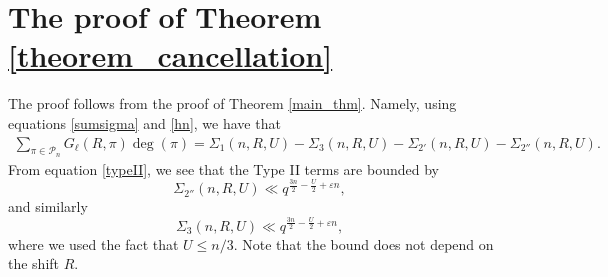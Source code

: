 \documentclass[12pt]{amsart}
\begin{document}
\section{The proof of Theorem \ref{theorem_cancellation}} \label{proof-thm-cancellation}
The proof follows from the proof of Theorem \ref{main_thm}. Namely, using equations \eqref{sumsigma} and \eqref{hn}, we have that
\begin{align*}
\sum_{\pi \in \mathcal{P}_n} G_{\ell}(R,\pi) \deg(\pi) =  \Sigma_1(n,R,U)-\Sigma_3(n,R,U)-\Sigma_{2'}(n,R,U)-\Sigma_{2''}(n,R,U).
\end{align*}
From equation \eqref{typeII}, we see that the Type II terms are bounded by 
\begin{equation}
\label{bdagain}
\Sigma_{2''}(n,R,U) \ll q^{\frac{3n}{2}-\frac{U}{2}+\varepsilon n } ,
\end{equation}
and similarly 
\begin{equation}
\label{bdagain2}
\Sigma_{3}(n,R,U) \ll   q^{\frac{3n}{2}-\frac{U}{2}+\varepsilon n } ,
\end{equation}
where we used the fact that $U \leq n/3$. Note that the bound does not depend on the shift $R$.
\end{document}
